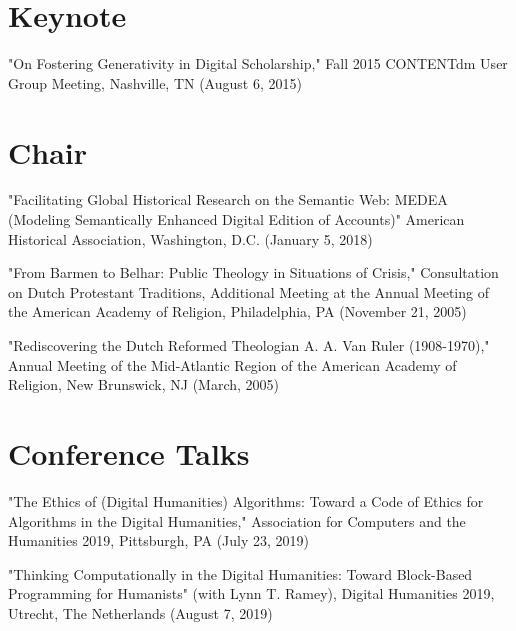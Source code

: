 \documentclass[10pt]{res} %
\begin{document}
\begin{resume}
\section{Keynote}

\begin{hangparas}{.25in}{1}"On Fostering Generativity in Digital Scholarship," Fall 2015 CONTENTdm User Group Meeting, Nashville, TN (August 6, 2015)\end{hangparas}

\section{Chair}

\begin{hangparas}{.25in}{1}"Facilitating Global Historical Research on the Semantic Web: MEDEA (Modeling Semantically Enhanced Digital Edition of Accounts)" American Historical Association, Washington, D.C. (January 5, 2018)\end{hangparas}

\begin{hangparas}{.25in}{1}"From Barmen to Belhar: Public Theology in Situations of Crisis," Consultation on Dutch Protestant Traditions, Additional Meeting at the Annual Meeting of the American Academy of Religion, Philadelphia, PA (November 21, 2005)\end{hangparas}

\begin{hangparas}{.25in}{1}"Rediscovering the Dutch Reformed Theologian A. A. Van Ruler (1908-1970)," Annual Meeting of the Mid-Atlantic Region of the American Academy of Religion, New Brunswick, NJ (March, 2005)\end{hangparas}

\section{Conference Talks}

\begin{hangparas}{.25in}{1}"The Ethics of (Digital Humanities) Algorithms: Toward a Code of Ethics for Algorithms in the Digital Humanities," Association for Computers and the Humanities 2019, Pittsburgh, PA (July 23, 2019)\end{hangparas}

\begin{hangparas}{.25in}{1}"Thinking Computationally in the Digital Humanities: Toward Block-Based Programming for Humanists" (with Lynn T. Ramey), Digital Humanities 2019, Utrecht, The Netherlands (August 7, 2019)\end{hangparas}


\end{resume}
\end{document}
